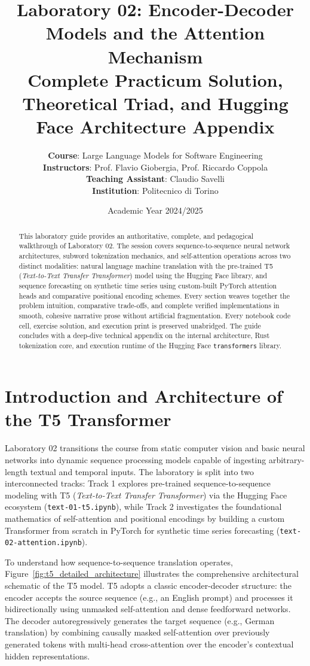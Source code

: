 \documentclass[11pt,a4paper]{article}
\title{\LARGE \textbf{Laboratory 02: Encoder-Decoder Models and the Attention Mechanism}\\[0.4em]
\large \textsf{Complete Practicum Solution, Theoretical Triad, and Hugging Face Architecture Appendix}}
\author{\textbf{Course}: Large Language Models for Software Engineering \\
\textbf{Instructors}: Prof. Flavio Giobergia, Prof. Riccardo Coppola \\
\textbf{Teaching Assistant}: Claudio Savelli \\
\textbf{Institution}: Politecnico di Torino}
\date{Academic Year 2024/2025}
\begin{document}
\maketitle

\begin{abstract}
This laboratory guide provides an authoritative, complete, and pedagogical walkthrough of Laboratory 02. The session covers sequence-to-sequence neural network architectures, subword tokenization mechanics, and self-attention operations across two distinct modalities: natural language machine translation with the pre-trained T5 (\emph{Text-to-Text Transfer Transformer}) model using the Hugging Face library, and sequence forecasting on synthetic time series using custom-built PyTorch attention heads and comparative positional encoding schemes. Every section weaves together the problem intuition, comparative trade-offs, and complete verified implementations in smooth, cohesive narrative prose without artificial fragmentation. Every notebook code cell, exercise solution, and execution print is preserved unabridged. The guide concludes with a deep-dive technical appendix on the internal architecture, Rust tokenization core, and execution runtime of the Hugging Face \texttt{transformers} library.
\end{abstract}

\tableofcontents
\newpage


\section{Introduction and Architecture of the T5 Transformer}

Laboratory 02 transitions the course from static computer vision and basic neural networks into dynamic sequence processing models capable of ingesting arbitrary-length textual and temporal inputs. The laboratory is split into two interconnected tracks: Track 1 explores pre-trained sequence-to-sequence modeling with T5 (\emph{Text-to-Text Transfer Transformer}) via the Hugging Face ecosystem (\texttt{text-01-t5.ipynb}), while Track 2 investigates the foundational mathematics of self-attention and positional encodings by building a custom Transformer from scratch in PyTorch for synthetic time series forecasting (\texttt{text-02-attention.ipynb}).

To understand how sequence-to-sequence translation operates, Figure~\ref{fig:t5_detailed_architecture} illustrates the comprehensive architectural schematic of the T5 model. T5 adopts a classic encoder-decoder structure: the encoder accepts the source sequence (e.g., an English prompt) and processes it bidirectionally using unmasked self-attention and dense feedforward networks. The decoder autoregressively generates the target sequence (e.g., German translation) by combining causally masked self-attention over previously generated tokens with multi-head cross-attention over the encoder's contextual hidden representations.
\end{document}
